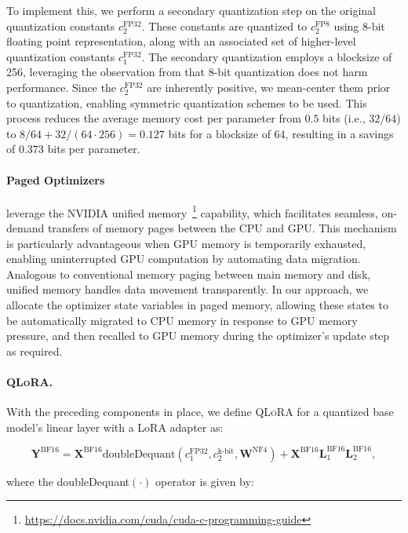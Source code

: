 To implement this, we perform a secondary quantization step on the original quantization constants $c_2^{\text{FP32}}$. These constants are quantized to $c_2^{\text{FP8}}$ using 8-bit floating point representation, along with an associated set of higher-level quantization constants $c_1^{\text{FP32}}$. The secondary quantization employs a blocksize of 256, leveraging the observation from \citet{dettmers2022case} that 8-bit quantization does not harm performance. Since the $c_2^{\text{FP32}}$ are inherently positive, we mean-center them prior to quantization, enabling symmetric quantization schemes to be used. This process reduces the average memory cost per parameter from $0.5$ bits (i.e., $32/64$) to $8/64 + 32/(64\cdot256) = 0.127$ bits for a blocksize of 64, resulting in a savings of $0.373$ bits per parameter.

\paragraph{Paged Optimizers} leverage the NVIDIA unified memory~\footnote{\tiny \url{https://docs.nvidia.com/cuda/cuda-c-programming-guide}} capability, which facilitates seamless, on-demand transfers of memory pages between the CPU and GPU. This mechanism is particularly advantageous when GPU memory is temporarily exhausted, enabling uninterrupted GPU computation by automating data migration. Analogous to conventional memory paging between main memory and disk, unified memory handles data movement transparently. In our approach, we allocate the optimizer state variables in paged memory, allowing these states to be automatically migrated to CPU memory in response to GPU memory pressure, and then recalled to GPU memory during the optimizer’s update step as required.

\paragraph{\textsc{QLoRA}.} With the preceding components in place, we define \textsc{QLoRA} for a quantized base model’s linear layer with a LoRA adapter as:

\begin{equation}
    \mathbf{Y}^{\text{BF16}} =  \mathbf{X}^{\text{BF16}} \text{doubleDequant}(c_1^{\text{FP32}}, c_2^{\text{k-bit}}, \mathbf{W}^{\text{NF4}}) + \mathbf{X}^{\text{BF16}}\mathbf{L}^{\text{BF16}}_1\mathbf{L}^{\text{BF16}}_2,
\end{equation}

where the doubleDequant$(\cdot)$ operator is given by:

